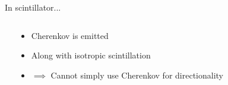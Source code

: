 \documentclass[14pt]{beamer}
\begin{document}
\begin{frame}{In scintillator...}
\begin{columns}[t]
\begin{block}{}
		\end{block}
		\begin{block}{}
			\begin{itemize}
				\item<3-> Cherenkov is emitted
				\item<4-> Along with isotropic scintillation
				\item<5-> {\color{red}$\implies$ Cannot simply use Cherenkov
					for directionality}
			\end{itemize}
		\end{block}
	\end{columns}
\end{frame}
\end{document}
